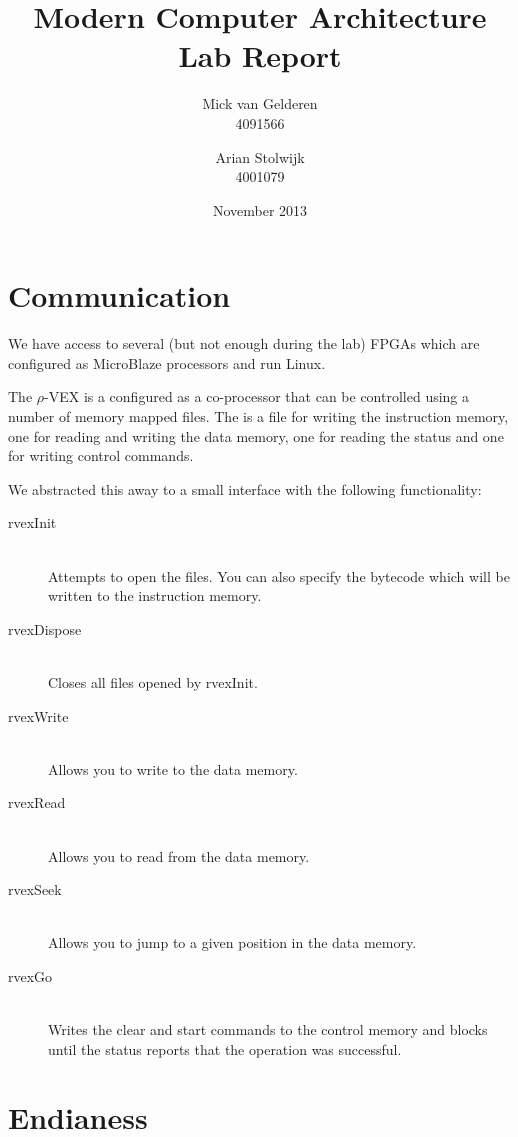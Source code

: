 \documentclass{article}
\title{Modern Computer Architecture\\Lab Report}
\author{%
    Mick van Gelderen\\4091566
    \and
    Arian Stolwijk\\4001079
}
\date{November 2013}
\newcommand{\rvex}{\ensuremath{\rho}-VEX}
\begin{document}
\maketitle






\section{Communication}

We have access to several (but not enough during the lab) FPGAs which are
configured as MicroBlaze processors and run Linux.

The \rvex{} is a configured as a co-processor that can be controlled using a
number of memory mapped files. The is a file for writing the instruction
memory, one for reading and writing the data memory, one for reading the status
and one for writing control commands.

We abstracted this away to a small interface with the following functionality:

\begin{description}
    \item[rvexInit] \hfill \\
        Attempts to open the files. You can also specify the bytecode which
        will be written to the instruction memory.
    \item[rvexDispose] \hfill \\
        Closes all files opened by rvexInit.
    \item[rvexWrite] \hfill \\
        Allows you to write to the data memory.
    \item[rvexRead] \hfill \\
        Allows you to read from the data memory.
    \item[rvexSeek] \hfill \\
        Allows you to jump to a given position in the data memory.
    \item[rvexGo] \hfill \\
        Writes the clear and start commands to the control memory and blocks
        until the status reports that the operation was successful.
\end{description}


\section{Endianess}
\end{document}

